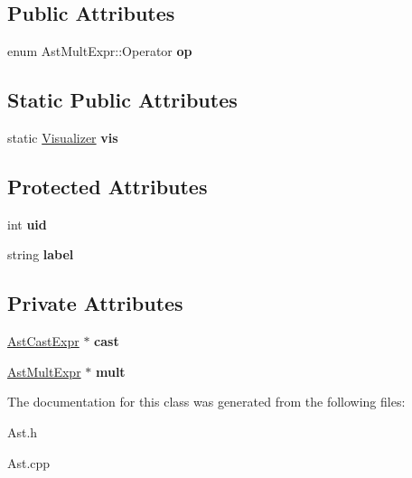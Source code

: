 \subsection*{Public Attributes}
\begin{DoxyCompactItemize}
\item 
\hypertarget{classAstMultExpr_a4a80457ab4cbc7a3b74a9361c3303bc9}{enum Ast\-Mult\-Expr\-::\-Operator {\bfseries op}}\label{classAstMultExpr_a4a80457ab4cbc7a3b74a9361c3303bc9}

\end{DoxyCompactItemize}
\subsection*{Static Public Attributes}
\begin{DoxyCompactItemize}
\item 
\hypertarget{classAST_aca9e6637209b31e03a09c0d42f29bdfa}{static \hyperlink{classVisualizer}{Visualizer} {\bfseries vis}}\label{classAST_aca9e6637209b31e03a09c0d42f29bdfa}

\end{DoxyCompactItemize}
\subsection*{Protected Attributes}
\begin{DoxyCompactItemize}
\item 
\hypertarget{classAST_a847b778f1c3dd5a19de32de432ee6e15}{int {\bfseries uid}}\label{classAST_a847b778f1c3dd5a19de32de432ee6e15}

\item 
\hypertarget{classAST_ab2e239ccc0688d2341724432ff5a1a31}{string {\bfseries label}}\label{classAST_ab2e239ccc0688d2341724432ff5a1a31}

\end{DoxyCompactItemize}
\subsection*{Private Attributes}
\begin{DoxyCompactItemize}
\item 
\hypertarget{classAstMultExpr_a880ddc32727181bc1d8cce71a3fb6f76}{\hyperlink{classAstCastExpr}{Ast\-Cast\-Expr} $\ast$ {\bfseries cast}}\label{classAstMultExpr_a880ddc32727181bc1d8cce71a3fb6f76}

\item 
\hypertarget{classAstMultExpr_a94749396ed57a7d86113c9a198e9560d}{\hyperlink{classAstMultExpr}{Ast\-Mult\-Expr} $\ast$ {\bfseries mult}}\label{classAstMultExpr_a94749396ed57a7d86113c9a198e9560d}

\end{DoxyCompactItemize}


The documentation for this class was generated from the following files\-:\begin{DoxyCompactItemize}
\item 
Ast.\-h\item 
Ast.\-cpp\end{DoxyCompactItemize}
